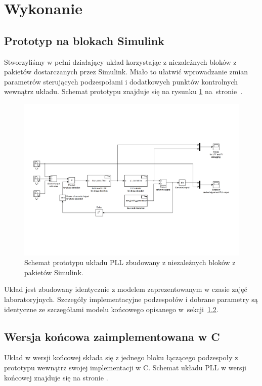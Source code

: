 \section{Wykonanie}
\label{sec:wykonanie}

\subsection{Prototyp na blokach Simulink}

Stworzyliśmy w pełni działający układ korzystając z niezależnych
bloków z pakietów dostarczanych przez Simulink. Miało to ułatwić wprowadzanie
zmian parametrów sterujących podzespołami i dodatkowych punktów kontrolnych
wewnątrz układu. Schemat prototypu znajduje się na rysunku
\ref{fig:pll_prototyp} na~stronie~\pageref{fig:pll_prototyp}.

\begin{figure}[h]
    \centering
    \includegraphics[angle=180, trim=5cm 1cm 5cm 1cm, scale=0.8]{./figury/schemat-prototypu}
    \caption{Schemat prototypu układu PLL zbudowany z niezależnych bloków z
        pakietów Simulink.}
    \label{fig:pll_prototyp}
\end{figure}

Układ jest zbudowany identycznie z modelem zaprezentowanym w czasie zajęć
laboratoryjnych. Szczegóły implementacyjne podzespołów i dobrane parametry są
identyczne ze szczegółami modelu końcowego opisanego
w~sekcji~\ref{sec:pll}.


\subsection{Wersja końcowa zaimplementowana w C}
\label{sec:pll}
Układ w wersji końcowej składa się z jednego bloku łączącego podzespoły z
prototypu wewnątrz swojej implementacji w C. Schemat układu PLL w wersji
końcowej znajduje się na stronie \pageref{fig:pll}.

